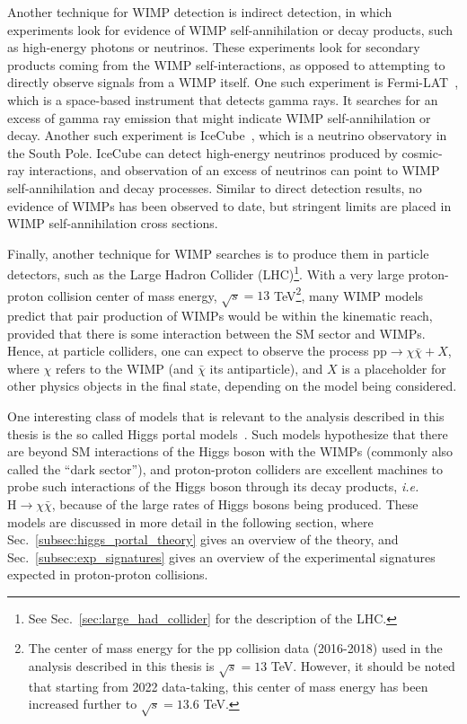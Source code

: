 Another technique for WIMP detection is indirect detection, in which experiments look 
for evidence of WIMP self-annihilation or decay products,
such as high-energy photons or neutrinos. These experiments look for secondary products coming from the WIMP
self-interactions, as opposed to attempting to directly observe signals from a WIMP itself. One such experiment is
Fermi-LAT~\cite{Fermi-LAT:2011vow}, which is a space-based instrument that detects gamma rays. It searches for an excess
of gamma ray emission that might indicate WIMP self-annihilation or decay. Another such experiment is IceCube~\cite{Iovine:2022aiw},
which is a neutrino observatory in the South Pole. IceCube can detect high-energy neutrinos produced by cosmic-ray interactions,
and observation of an excess of neutrinos can point to WIMP self-annihilation and decay processes. Similar to direct detection results,
no evidence of WIMPs has been observed to date, but stringent limits are placed in WIMP self-annihilation cross sections. 

Finally, another technique for WIMP searches is to produce them in particle detectors, such as the Large Hadron Collider 
(LHC)\footnote{See Sec.~\ref{sec:large_had_collider} for the description of the LHC.}. 
With a very large proton-proton collision
center of mass energy, $\sqrt{s} = 13$ TeV\footnote{The center of mass energy for the pp collision data (2016-2018) 
used in the analysis described in this thesis is $\sqrt{s} = 13$ TeV. 
However, it should be noted that starting from 2022 data-taking, this center of mass
energy has been increased further to $\sqrt{s} = 13.6$ TeV.}, many WIMP models predict that pair production of WIMPs would be
within the kinematic reach, provided that there is some interaction between the SM sector and WIMPs. Hence, at particle colliders,
one can expect to observe the process $\textrm{pp} \rightarrow \chi \bar{\chi} + X$, where $\chi$ refers to the WIMP (and $\bar{\chi}$
its antiparticle), and $X$ is a placeholder for other physics objects in the final state, depending on the model being considered.

One interesting class of models that is relevant to the analysis described in this thesis is the so called Higgs portal models~\cite{Argyropoulos:2021sav}.
Such models hypothesize that there are beyond SM interactions of the Higgs boson with the WIMPs (commonly also called the ``dark sector''),
and proton-proton colliders are excellent machines to probe such interactions of the Higgs boson through its decay products, \textit{i.e.} 
$\textrm{H} \rightarrow \chi \bar{\chi}$, because of the large rates of Higgs bosons being produced. These models are discussed in more detail in the
following section, where Sec.~\ref{subsec:higgs_portal_theory} gives an overview of the theory, and Sec.~\ref{subsec:exp_signatures} gives an overview
of the experimental signatures expected in proton-proton collisions.  




